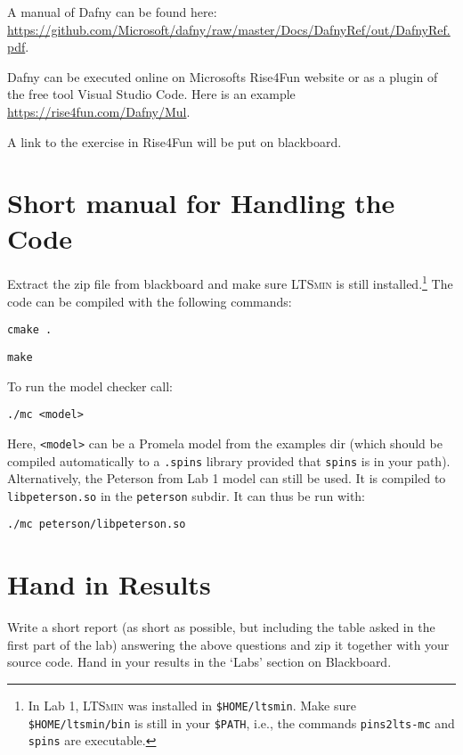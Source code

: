 \documentclass[12pt]{article}
\def\ltsmin{\textsc{LTSmin}\xspace}
\begin{document}
A manual of Dafny can be found here:
\url{https://github.com/Microsoft/dafny/raw/master/Docs/DafnyRef/out/DafnyRef.pdf}.

Dafny can be executed online on Microsofts Rise4Fun website or 
as a plugin of the free tool Visual Studio Code.
Here is an example \url{https://rise4fun.com/Dafny/Mul}.

A link to the exercise in Rise4Fun will be put on blackboard.


\section{Short manual for Handling the Code}


Extract the zip file from blackboard and make 
sure \ltsmin is still installed.\footnote{In Lab 1,
\ltsmin was installed in \texttt{\$HOME/ltsmin}.
Make sure \texttt{\$HOME/ltsmin/bin} is still in your
\texttt{\$PATH}, i.e., the commands \texttt{pins2lts-mc} and \texttt{spins} are executable.}
The code can be compiled with the following commands:

\texttt{cmake .}

\texttt{make}


To run the model checker call:

\texttt{./mc <model>}

Here, \texttt{<model>} can be a Promela model
from the examples dir (which should be compiled
automatically to a \texttt{.spins} library
provided that \texttt{spins} is in your path).
Alternatively, the Peterson from Lab 1 model can 
still be used. It is compiled to \texttt{libpeterson.so}
in the \texttt{peterson} subdir. It can thus be run with:

\texttt{./mc peterson/libpeterson.so}






\section{Hand in Results}

Write a short report (as short as possible, but including the table asked in the first part of the lab) answering the above questions and zip it together with
your source code.
Hand in your results in the `Labs' section on Blackboard.





\end{document}
